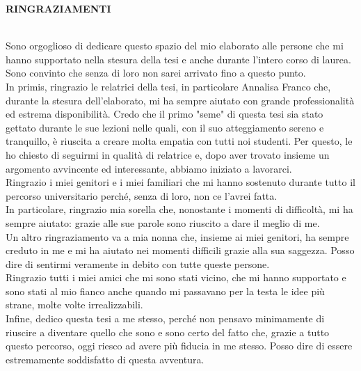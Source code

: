 \documentclass[a4paper,final,12pt]{report}
\newcommand\tab[1][13mm]{\hspace*{#1}}
\begin{document}
\setlength{\parindent}{0pt}
\begin{LARGE}
\textbf{RINGRAZIAMENTI\\\\}
\end{LARGE}
\tab[10pt] Sono orgoglioso di dedicare questo spazio del mio elaborato alle persone che mi hanno supportato nella stesura della tesi e anche durante l'intero corso di laurea. Sono convinto che senza di loro non sarei arrivato fino a questo punto.\\
\tab[10pt] In primis, ringrazio le relatrici della tesi, in particolare Annalisa Franco che, durante la stesura dell'elaborato, mi ha sempre aiutato con grande professionalità ed estrema disponibilità. Credo che il primo "seme" di questa tesi sia stato gettato durante le sue lezioni nelle quali, con il suo atteggiamento sereno e tranquillo, è riuscita a creare molta empatia con tutti noi studenti. Per questo, le ho chiesto di seguirmi in qualità di relatrice e, dopo aver trovato insieme un argomento avvincente ed interessante, abbiamo iniziato a lavorarci.\\
\tab[10pt] Ringrazio i miei genitori e i miei familiari che mi hanno sostenuto durante tutto il percorso universitario perché, senza di loro, non ce l'avrei fatta. \\
\tab[10pt]In particolare, ringrazio mia sorella che, nonostante i momenti di difficoltà, mi ha sempre aiutato: grazie alle sue parole sono riuscito a dare il meglio di me.\\
\tab[10pt] Un altro ringraziamento va a mia nonna che, insieme ai miei genitori, ha sempre creduto in me e mi ha aiutato nei momenti difficili grazie alla sua saggezza. Posso dire di sentirmi veramente in debito con tutte queste persone.\\
\tab[10pt] Ringrazio tutti i miei amici che mi sono stati vicino, che mi hanno supportato e sono stati al mio fianco anche quando mi passavano per la testa le idee più strane, molte volte irrealizzabili.\\
\tab[10pt]Infine, dedico questa tesi a me stesso, perché non pensavo minimamente di riuscire a diventare quello che sono e sono certo del fatto che, grazie a tutto questo percorso, oggi riesco ad avere più fiducia in me stesso. Posso dire di essere estremamente soddisfatto di questa avventura.


\tableofcontents
\setlength{\parindent}{0pt}
\end{document}
